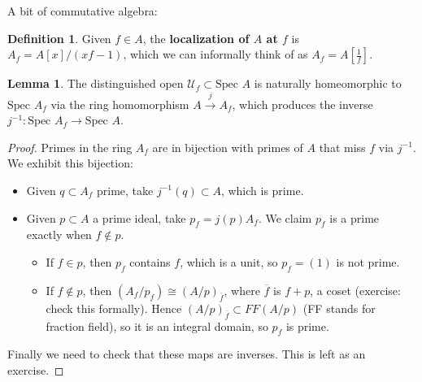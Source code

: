 \documentclass{article}
\theoremstyle{definition}
\newtheorem{lemma}[theorem]{Lemma}
\newtheorem{defn}{Definition}[section]
\begin{document}
A bit of commutative algebra: 
\begin{defn}
    Given $f \in A$, the \textbf{localization of $A$ at $f$} is $A_f = A[x]/(xf-1)$, which we can informally think of as $A_f = A[\frac{1}{f}]$.
\end{defn}
\begin{lemma}
    The distinguished open $\mathcal{U}_f \subset \text{Spec }A$ is naturally homeomorphic to $\text{Spec }A_f$ via the ring homomorphism $A \stackrel{j}{\to} A_f$, which produces the inverse $j^{-1}: \text{Spec }A_f \to \text{Spec }A$.
\end{lemma}
\begin{proof}
    Primes in the ring $A_f$ are in bijection with primes of $A$ that miss $f$ via $j^{-1}$. We exhibit this bijection: 
    \begin{itemize}
        \item Given $q \subset A_f$ prime, take $j^{-1}(q) \subset A$, which is prime. 
        \item Given $p \subset A$ a prime ideal, take $p_f = j(p) A_f$. We claim $p_f$ is a prime exactly when $f \not\in p$.
        \begin{itemize}
            \item If $f \in p$, then $p_f$ contains $f$, which is a unit, so $p_f = (1)$ is not prime.
            \item If $f \not\in p$, then $\left( A_f/p_f \right) \cong \left( A/p\right)_{\overline{f}}$, where $\overline{f}$ is $f + p$, a coset (exercise: check this formally). Hence $\left(A/p \right)_{\overline{f}} \subset FF \left(A/p \right)$ (FF stands for fraction field), so it is an integral domain, so $p_f$ is prime.
        \end{itemize}
    \end{itemize}
    Finally we need to check that these maps are inverses. This is left as an exercise.
\end{proof}
\end{document}
